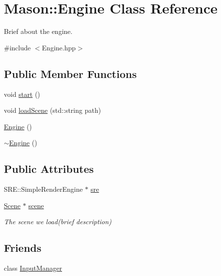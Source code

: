 \hypertarget{class_mason_1_1_engine}{}\section{Mason\+:\+:Engine Class Reference}
\label{class_mason_1_1_engine}


Brief about the engine.  




{\ttfamily \#include $<$Engine.\+hpp$>$}

\subsection*{Public Member Functions}
\begin{DoxyCompactItemize}
\item 
void \hyperlink{class_mason_1_1_engine_a4d8066dd213a03f5420d1bf60f150ca7}{start} ()
\item 
void \hyperlink{class_mason_1_1_engine_ab7f05ee3e9f917f11ed0deb20d4508b0}{load\+Scene} (std\+::string path)
\item 
\hyperlink{class_mason_1_1_engine_a8c98683b0a3aa28d8ab72a8bcd0d52f2}{Engine} ()
\item 
\hyperlink{class_mason_1_1_engine_a8ef7030a089ecb30bbfcb9e43094717a}{$\sim$\+Engine} ()
\end{DoxyCompactItemize}
\subsection*{Public Attributes}
\begin{DoxyCompactItemize}
\item 
S\+R\+E\+::\+Simple\+Render\+Engine $\ast$ \hyperlink{class_mason_1_1_engine_a8b5ac2d43f0b366ff51c0908fe581f17}{sre}
\item 
\hyperlink{class_mason_1_1_scene}{Scene} $\ast$ \hyperlink{class_mason_1_1_engine_a2ec6bc225a9327484dde73bb8298ea85}{scene}
\begin{DoxyCompactList}\small\item\em The scene we load(brief description) \end{DoxyCompactList}\end{DoxyCompactItemize}
\subsection*{Friends}
\begin{DoxyCompactItemize}
\item 
class \hyperlink{class_mason_1_1_engine_af0e8c3dcc20b7ddcaf63506363a22821}{Input\+Manager}
\end{DoxyCompactItemize}


